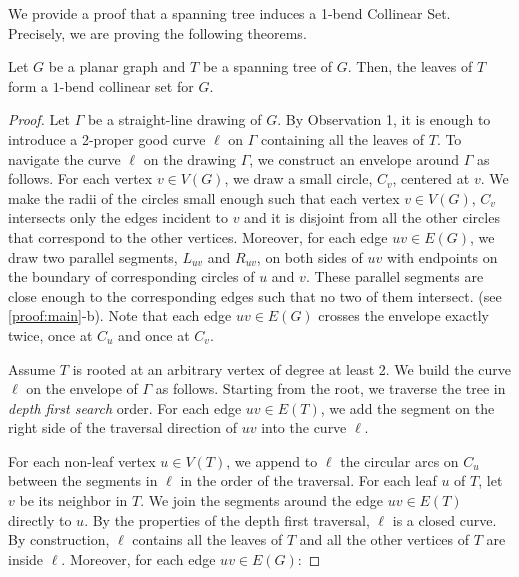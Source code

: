 

We provide a proof that a spanning tree induces a 1-bend Collinear Set. Precisely, we are proving the following theorems.

\begin{thm} \label{app-main}

Let $G$ be a planar graph and $T$ be a spanning tree of $G$. Then, the leaves of $T$ form a $1$-bend collinear set for $G$.

\end{thm}

\begin{proof}

    Let $\Gamma$ be a straight-line drawing of $G$.
    By Observation 1, it is enough to introduce a 2-proper good curve $\ell$ on $\Gamma$ containing all the leaves of $T$. To navigate the curve $\ell$ on the drawing $\Gamma$, we construct an envelope around $\Gamma$ as follows. For each vertex $v \in V(G)$, we draw a small circle, $C_v$, centered at $v$. We make the radii of the circles small enough such that each vertex $v \in V(G)$, $C_v$ intersects only the edges incident to $v$ and it is disjoint from all the other circles that correspond to the other vertices. Moreover, for each edge $uv \in E(G)$, we draw two parallel segments, $L_{uv}$ and $R_{uv}$, on both sides of $uv$ with endpoints on the boundary of corresponding circles of $u$ and $v$. These parallel segments are close enough to the corresponding edges such that no two of them intersect. (see \cref{proof:main}-b). Note that each edge $uv \in E(G)$ crosses the envelope exactly twice, once at $C_u$ and once at $C_v$.

    Assume $T$ is rooted at an arbitrary vertex of degree at least 2. We build the curve $\ell$ on the envelope of $\Gamma$ as follows. Starting from the root, we traverse the tree in \textit{depth first search} order. For each edge $uv \in E(T)$, we add the segment on the right side of the traversal direction of $uv$ into the curve $\ell$.

    For each non-leaf vertex $u \in V(T)$, we append to $\ell$ the circular arcs on $C_u$ between the segments in $\ell$ in the order of the traversal. For each leaf $u$ of $T$, let $v$ be its neighbor in $T$. We join the segments around the edge $uv \in E(T)$ directly to $u$. By the properties of the depth first traversal, $\ell$ is a closed curve. By construction, $\ell$ contains all the leaves of $T$ and all the other vertices of $T$ are inside $\ell$. Moreover, for each edge $uv \in E(G)$:


\end{proof}
